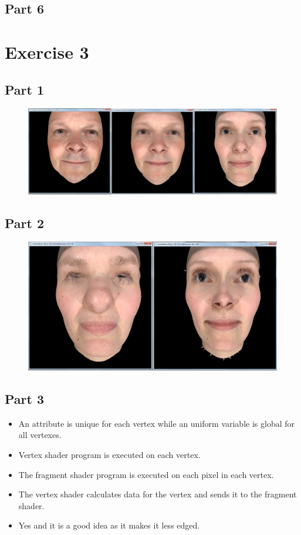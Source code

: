 \documentclass[11pt]{article}
\begin{document}
\subsection{Part 6}

\section{Exercise 3}
\subsection{Part 1}
\begin{figure}[H]
	\centering
	\includegraphics[width=0.5\linewidth]{images/e03p1}
	\label{fig:e03p1}
\end{figure}


\subsection{Part 2}
\begin{figure}[H]
	\centering
	\includegraphics[width=0.5\linewidth]{images/e03p2}
	\label{fig:e03p2}
\end{figure}


\subsection{Part 3}
\begin{itemize}
	\item An attribute is unique for each vertex while an uniform variable is global for all vertexes.
	\item Vertex shader program is executed on each vertex.
	\item The fragment shader program is executed on each pixel in each vertex.
	\item The vertex shader calculates data for the vertex and sends it to the fragment shader.
	\item Yes and it is a good idea as it makes it less edged.
\end{itemize}
\end{document}
